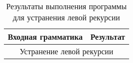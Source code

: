 \begin{table}[h!]
    \caption{Результаты выполнения программы для устранения левой рекурсии}
    \label{tab:results1}
    \begin{tabular}{|ll|}
    \hline
    \multicolumn{1}{|c|}{Входная грамматика}                                                                                                                                                                                                                                                                                         & \multicolumn{1}{c|}{Результат}                                                                                                                                                                                                                                                                                                                                                                                                                                                                                                        \\ \hline
    \multicolumn{2}{|c|}{Устранение левой рекурсии}                                                                                                                                                                                                                                                                                                                                                                                                                                                                                                                                                                                                                                                                                                                                                                                                                          \\ \hline

\end{tabular}
\end{table}
